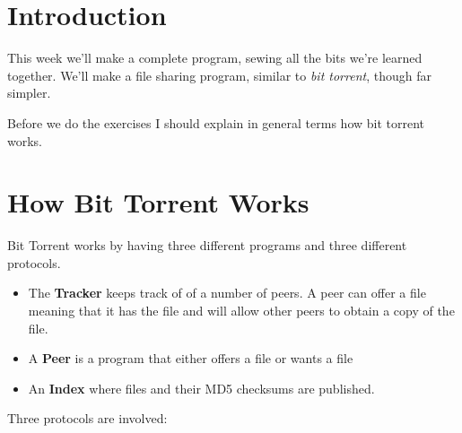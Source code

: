 \documentclass[12pt]{hitec}
\begin{document}
\section{Introduction}

This week we'll make a complete program, sewing all the bits we're learned together.
We'll make a file sharing program, similar to {\sl bit torrent}, though far simpler.

Before we do the exercises I should explain in general terms how bit torrent works.

\section*{How Bit Torrent Works}

Bit Torrent works by having three different programs and three different protocols.

\begin{itemize}

\item The {\bf Tracker} keeps  track of of a number of peers. A peer can offer a file
  meaning that it has the file and will allow other peers to obtain a copy of the file.
\item A {\bf Peer} is a program that either offers a file or wants a file
\item An {\bf Index} where files and their MD5 checksums are published.
  
\end{itemize}

Three protocols are involved:
\end{document}
